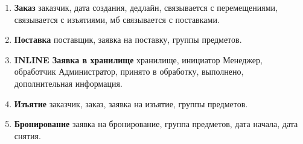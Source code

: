 \begin{enumerate}
  \item \textbf{Заказ}
        заказчик,
        дата создания,
        дедлайн,
        связывается с перемещениями,
        связывается с изъятиями,
        мб связывается с поставками.

  \item \textbf{Поставка}
        поставщик,
        заявка на поставку,
        группы предметов.

  \item \textbf{INLINE Заявка в хранилище}
        хранилище,
        инициатор Менеджер,
        обработчик Администратор,
        принято в обработку,
        выполнено,
        дополнительная информация.

  \item \textbf{Изъятие}
        заказчик,
        заказ,
        заявка на изъятие,
        группы предметов.
  
  \item \textbf{Бронирование}
        заявка на бронирование,
        группа предметов,
        дата начала,
        дата снятия.

\end{enumerate}
